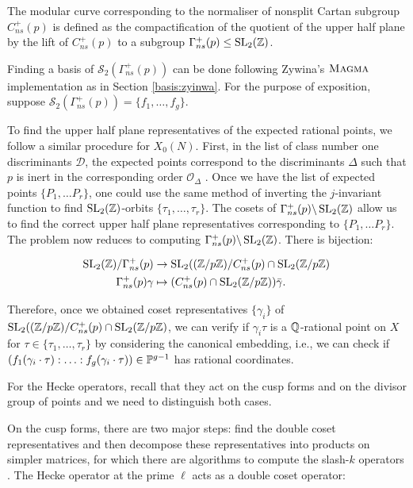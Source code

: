  The modular curve corresponding to the normaliser of nonsplit Cartan subgroup $C_{ns}^+(p)$ is defined as the compactification of the quotient of the upper half plane by the lift of $C_{ns}^+(p)$ to a subgroup $\Gamma_{ns}^+(p) \leq \operatorname{SL}_2(\mathbb{Z})$.
 
 Finding a basis of $\mathcal{S}_2(\Gamma_{ns}^+(p))$ can be done following Zywina's $\textsc{Magma}{}$ implementation as in Section \ref{basis:zyinwa}. For the purpose of exposition, suppose $\mathcal{S}_2(\Gamma_{ns}^+(p)) = \{ f_1, \ldots, f_g \}$.
 
 To find the upper half plane representatives of the expected rational points, we follow a similar procedure for $X_0(N)$. First, in the list of class number one discriminants $\mathcal{D}$, the expected points correspond to the discriminants $\Delta$ such that $p$ is inert in the corresponding order $\mathcal{O}_\Delta$ \cite{Mazur77}. Once we have the list of expected points $\{ P_1, \ldots P_r \}$, one could use the same method of inverting the $j$-invariant function to find $\operatorname{SL}_2(\mathbb{Z})$-orbits $\{ \tau_1, \ldots, \tau_r \}$. The cosets of $\Gamma_{ns}^+(p) \backslash \operatorname{SL}_2(\mathbb{Z})$ allow us to find the correct upper half plane representatives corresponding to $\{ P_1, \ldots P_r \}$. The problem now reduces to computing $\Gamma_{ns}^+(p) \backslash \operatorname{SL}_2(\mathbb{Z})$. There is bijection:
 
 \begin{align*}
    \operatorname{SL}_2(\mathbb{Z})/\Gamma_{ns}^+(p) &\rightarrow \operatorname{SL}_2((\mathbb{Z}/p\mathbb{Z})/C_{ns}^+(p) \cap \operatorname{SL}_2(\mathbb{Z}/p\mathbb{Z})\\
      \Gamma_{ns}^+(p) \gamma &\mapsto (C_{ns}^+(p) \cap \operatorname{SL}_2(\mathbb{Z}/p\mathbb{Z}))\bar{\gamma}.
\end{align*}

Therefore, once we obtained coset representatives $\{ \gamma_i \}$ of $\operatorname{SL}_2((\mathbb{Z}/p\mathbb{Z})/C_{ns}^+(p) \cap \operatorname{SL}_2(\mathbb{Z}/p\mathbb{Z})$, we can verify if $\gamma_i \tau$ is a $\mathbb{Q}$-rational point on $X$ for $\tau \in \{ \tau_1, \ldots, \tau_r\}$ by considering the canonical embedding, i.e., we can check if $(f_1(\gamma_i \cdot \tau) : \ldots : f_g(\gamma_i \cdot \tau)) \in \mathbb{P}^{g-1}$ has rational coordinates.

For the Hecke operators, recall that they act on the cusp forms and on the divisor group of points and we need to distinguish both cases.

On the cusp forms, there are two major steps: find the double coset representatives and then decompose these representatives into products on simpler matrices, for which there are algorithms to compute the slash-$k$ operators \cite{Zywina2020ComputingAO,Shurman}. The Hecke operator at the prime $\ell$ acts as a double coset operator:

